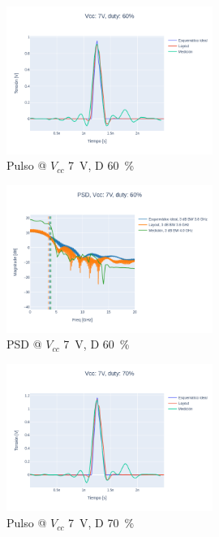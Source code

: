 \begin{figure}
  \centering
    \includegraphics[width=0.6\textwidth]{images/plots/Vcc_7V_duty_60_time_domain.png}
    \caption{Pulso @ $V_{cc}$ \qty{7}{\volt}, D \qty{60}{\percent} }
    \label{fig:plots_7v_60}
\end{figure}

\begin{figure}
  \centering
    \includegraphics[width=0.6\textwidth]{images/plots/Vcc_7V_duty_60_psd.png}
    \caption{PSD @ $V_{cc}$ \qty{7}{\volt}, D \qty{60}{\percent} }
    \label{fig:psd_7v_60}
\end{figure}

\begin{figure}
  \centering
    \includegraphics[width=0.6\textwidth]{images/plots/Vcc_7V_duty_70_time_domain.png}
    \caption{Pulso @ $V_{cc}$ \qty{7}{\volt}, D \qty{70}{\percent} }
    \label{fig:plots_7v_70}
\end{figure}

